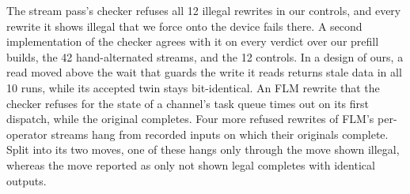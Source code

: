 The stream pass's checker refuses all 12 illegal rewrites in our controls, and every rewrite it shows illegal that we force onto the device fails there.
A second implementation of the checker agrees with it on every verdict over our prefill builds, the 42 hand-alternated streams, and the 12 controls.
In a design of ours, a read moved above the wait that guards the write it reads returns stale data in all 10 runs, while its accepted twin stays bit-identical.
An FLM rewrite that the checker refuses for the state of a channel's task queue times out on its first dispatch, while the original completes.
Four more refused rewrites of FLM's per-operator streams hang from recorded inputs on which their originals complete.
Split into its two moves, one of these hangs only through the move shown illegal, whereas the move reported as only not shown legal completes with identical outputs.
